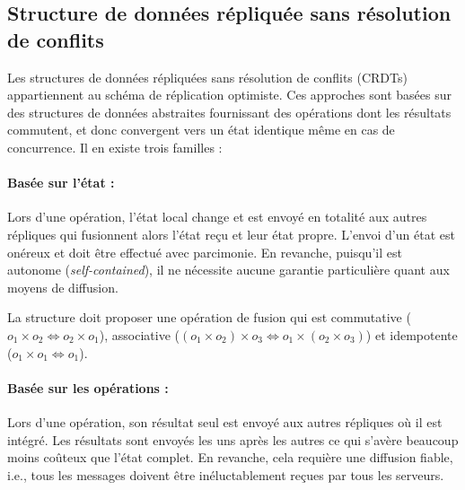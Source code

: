 \subsection{Structure de données répliquée sans résolution de conflits}
\label{repl:subsec:crdts}


Les structures de données répliquées sans résolution de conflits
(CRDTs)~\cite{shapiro2011comprehensive, shapiro2011conflict} appartiennent au
schéma de réplication optimiste. Ces approches sont basées sur des structures de
données abstraites fournissant des opérations dont les résultats commutent, et
donc convergent vers un état identique même en cas de concurrence.  Il en existe
trois familles :

\paragraph{Basée sur l'état :} Lors d'une opération, l'état local change et est
envoyé en totalité aux autres répliques qui fusionnent alors l'état reçu et leur
état propre. L'envoi d'un état est onéreux et doit être effectué avec
parcimonie. En revanche, puisqu'il est autonome (\emph{self-contained}), il ne
nécessite aucune garantie particulière quant aux moyens de diffusion.

\noindent La structure doit proposer une opération de fusion qui est commutative
($o_1 \times o_2 \Leftrightarrow o_2 \times o_1$), associative
($(o_1 \times o_2) \times o_3 \Leftrightarrow o_1 \times (o_2 \times o_3)$) et
idempotente ($o_1 \times o_1 \Leftrightarrow o_1$).

\paragraph{Basée sur les opérations :} Lors d'une opération, son résultat seul
est envoyé aux autres répliques où il est intégré. Les résultats sont envoyés
les uns après les autres ce qui s'avère beaucoup moins coûteux que l'état
complet. En revanche, cela requière une diffusion fiable, i.e., tous les
messages doivent être inéluctablement reçues par tous les serveurs.

